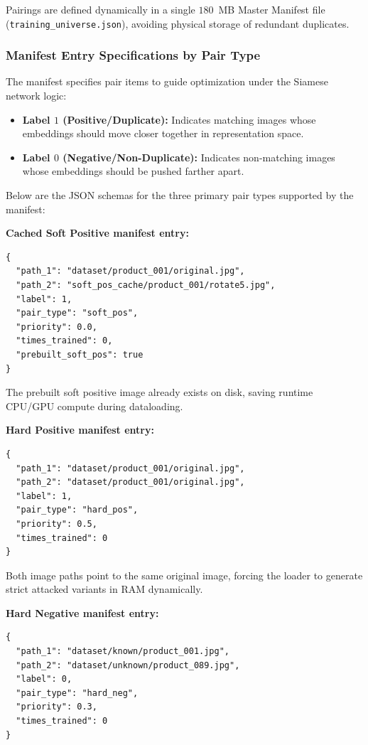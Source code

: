 \documentclass[11pt,a4paper]{article}
\begin{document}
Pairings are defined dynamically in a single $180$~MB Master Manifest file (\texttt{training\_universe.json}), avoiding physical storage of redundant duplicates.

\subsubsection{Manifest Entry Specifications by Pair Type}
The manifest specifies pair items to guide optimization under the Siamese network logic:
\begin{itemize}
    \item \textbf{Label $1$ (Positive/Duplicate):} Indicates matching images whose embeddings should move closer together in representation space.
    \item \textbf{Label $0$ (Negative/Non-Duplicate):} Indicates non-matching images whose embeddings should be pushed farther apart.
\end{itemize}

Below are the JSON schemas for the three primary pair types supported by the manifest:

\noindent\textbf{Cached Soft Positive manifest entry:}
\begin{lstlisting}
{
  "path_1": "dataset/product_001/original.jpg",
  "path_2": "soft_pos_cache/product_001/rotate5.jpg",
  "label": 1,
  "pair_type": "soft_pos",
  "priority": 0.0,
  "times_trained": 0,
  "prebuilt_soft_pos": true
}
\end{lstlisting}
The prebuilt soft positive image already exists on disk, saving runtime CPU/GPU compute during dataloading.

\vspace{0.2cm}
\noindent\textbf{Hard Positive manifest entry:}
\begin{lstlisting}
{
  "path_1": "dataset/product_001/original.jpg",
  "path_2": "dataset/product_001/original.jpg",
  "label": 1,
  "pair_type": "hard_pos",
  "priority": 0.5,
  "times_trained": 0
}
\end{lstlisting}
Both image paths point to the same original image, forcing the loader to generate strict attacked variants in RAM dynamically.

\vspace{0.2cm}
\noindent\textbf{Hard Negative manifest entry:}
\begin{lstlisting}
{
  "path_1": "dataset/known/product_001.jpg",
  "path_2": "dataset/unknown/product_089.jpg",
  "label": 0,
  "pair_type": "hard_neg",
  "priority": 0.3,
  "times_trained": 0
}
\end{lstlisting}
\end{document}
